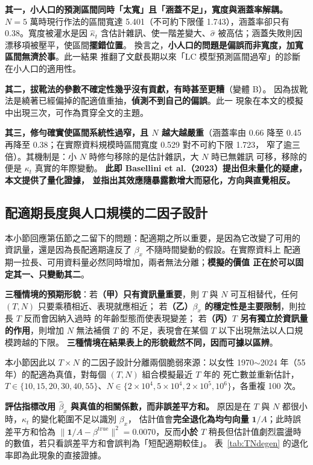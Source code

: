 \documentclass[UTF8, fontset=macnew, a4paper, 12pt]{ctexart}
\begin{document}
\textbf{其一，小人口的預測區間同時「太寬」且「涵蓋不足」，寬度與涵蓋率解耦。}
$N=5$ 萬時現行作法的區間寬達 5.401（不可約下限僅 1.743），涵蓋率卻只有
0.38。寬度被灌水是因 $\hat\kappa_t$ 含估計雜訊、使一階差變大、$\hat\sigma$
被高估；涵蓋失敗則因漂移項被壓平，使區間\textbf{擺錯位置}。
換言之，\textbf{小人口的問題是偏誤而非寬度，加寬區間無濟於事}。此一結果
推翻了文獻長期以來「LC 模型預測區間過窄」的診斷在小人口的適用性。

\textbf{其二，拔靴法的參數不確定性幾乎沒有貢獻，有時甚至更糟}（變體 B）。
因為拔靴法是繞著已經偏掉的配適值重抽，\textbf{偵測不到自己的偏誤}。此一
現象在本文的模擬中出現三次，可作為貫穿全文的主題。

\textbf{其三，修勻確實使區間系統性過窄，且 $N$ 越大越嚴重}（涵蓋率由 0.66
降至 0.45 再降至 0.38；在實際資料規模時區間寬度 0.529 對不可約下限 1.723，
窄了逾三倍）。其機制是：小 $N$ 時修勻移除的是估計雜訊，大 $N$ 時已無雜訊
可移，移除的便是 $\kappa_t$ 真實的年際變動。
\textbf{此即 Basellini et al.（2023）提出但未量化的疑慮，本文提供了量化證據，
並指出其效應隨暴露數增大而惡化，方向與直覺相反。}

\subsection{配適期長度與人口規模的二因子設計}\label{sec:TN}

本小節回應第伍節之二留下的問題：配適期之所以重要，是因為它改變了可用的
資訊量，還是因為長配適期違反了 $\beta_x$ 不隨時間變動的假設。在實際資料上
配適期一拉長、可用資料量必然同時增加，兩者無法分離；\textbf{模擬的價值
正在於可以固定其一、只變動其二}。

\textbf{三種情境的預期形貌}：若\textbf{（甲）只有資訊量重要}，則 $T$ 與 $N$
可互相替代，任何 $(T,N)$ 只要乘積相近、表現就應相近；
若\textbf{（乙）$\beta_x$ 的穩定性是主要限制}，則拉長 $T$ 反而會因納入過時
的年齡型態而使表現變差；
若\textbf{（丙）$T$ 另有獨立於資訊量的作用}，則增加 $N$ 無法補償 $T$ 的
不足，表現會在某個 $T$ 以下出現無法以人口規模跨越的下限。
\textbf{三種情境在結果表上的形貌截然不同，因而可據以區辨}。

本小節因此以 $T\times N$ 的二因子設計分離兩個脆弱來源：以女性
1970$\sim$2024 年（55 年）的配適為真值，對每個 $(T,N)$ 組合模擬最近 $T$ 年的
死亡數並重新估計，$T\in\{10,15,20,30,40,55\}$、$N\in\{2\times10^4, 5\times10^4,
2\times10^5, 10^6\}$，各重複 100 次。

\textbf{評估指標改用 $\hat\beta_x$ 與真值的相關係數，而非誤差平方和。}
原因是在 $T$ 與 $N$ 都很小時，$\kappa_t$ 的變化範圍不足以識別 $\beta_x$，
估計值會\textbf{完全退化為均勻向量} $\mathbf{1}/A$；此時誤差平方和恰為
$\|\mathbf{1}/A-\beta^{\text{true}}\|^2=0.0070$，反而\textbf{小於}
$T$ 稍長但估計值劇烈震盪時的數值，若只看誤差平方和會誤判為「短配適期較佳」。
表~\ref{tab:TNdegen} 的退化率即為此現象的直接證據。
\end{document}
